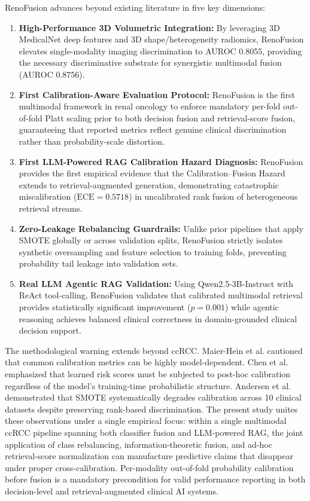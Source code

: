 RenoFusion advances beyond existing literature in five key dimensions:
\begin{enumerate}
    \item \textbf{High-Performance 3D Volumetric Integration:} By leveraging 3D MedicalNet deep features and 3D shape/heterogeneity radiomics, RenoFusion elevates single-modality imaging discrimination to AUROC 0.8055, providing the necessary discriminative substrate for synergistic multimodal fusion (AUROC 0.8756).
    \item \textbf{First Calibration-Aware Evaluation Protocol:} RenoFusion is the first multimodal framework in renal oncology to enforce mandatory per-fold out-of-fold Platt scaling prior to both decision fusion and retrieval-score fusion, guaranteeing that reported metrics reflect genuine clinical discrimination rather than probability-scale distortion.
    \item \textbf{First LLM-Powered RAG Calibration Hazard Diagnosis:} RenoFusion provides the first empirical evidence that the Calibration--Fusion Hazard extends to retrieval-augmented generation, demonstrating catastrophic miscalibration ($\text{ECE} = 0.5718$) in uncalibrated rank fusion of heterogeneous retrieval streams.
    \item \textbf{Zero-Leakage Rebalancing Guardrails:} Unlike prior pipelines that apply SMOTE globally or across validation splits, RenoFusion strictly isolates synthetic oversampling and feature selection to training folds, preventing probability tail leakage into validation sets.
    \item \textbf{Real LLM Agentic RAG Validation:} Using Qwen2.5-3B-Instruct with ReAct tool-calling, RenoFusion validates that calibrated multimodal retrieval provides statistically significant improvement ($p = 0.001$) while agentic reasoning achieves balanced clinical correctness in domain-grounded clinical decision support.
\end{enumerate}

The methodological warning extends beyond ccRCC. Maier-Hein et al. \cite{maierhein2024metrics} cautioned that common calibration metrics can be highly model-dependent. Chen et al. \cite{chen2016calibrating} emphasized that learned risk scores must be subjected to post-hoc calibration regardless of the model's training-time probabilistic structure. Andersen et al. \cite{andersen2024impact} demonstrated that SMOTE systematically degrades calibration across 10 clinical datasets despite preserving rank-based discrimination. The present study unites these observations under a single empirical focus: within a single multimodal ccRCC pipeline spanning both classifier fusion and LLM-powered RAG, the joint application of class rebalancing, information-theoretic fusion, and ad-hoc retrieval-score normalization can manufacture predictive claims that disappear under proper cross-calibration. Per-modality out-of-fold probability calibration before fusion is a mandatory precondition for valid performance reporting in both decision-level and retrieval-augmented clinical AI systems.
